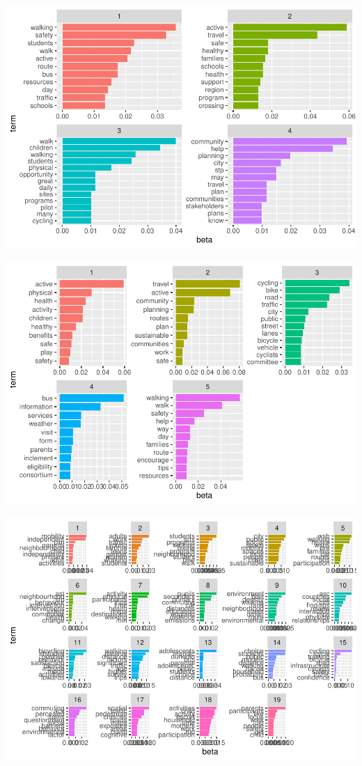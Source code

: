 \documentclass[]{elsarticle} %
\begin{document}
\includegraphics{AST-Framing-Ontario_files/figure-latex/consortia-terms-1.pdf}

\includegraphics{AST-Framing-Ontario_files/figure-latex/policy-terms-1.pdf}

\includegraphics{AST-Framing-Ontario_files/figure-latex/academic-terms-1.pdf}
\end{document}
